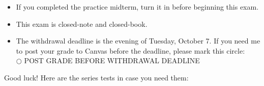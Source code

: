 \documentclass[12pt]{exam}
\begin{document}
\begin{center}
\end{center}
\vspace{0.1in}

\vspace{12pt}

\begin{itemize}
  \item If you completed the practice midterm, turn it in before beginning
        this exam.
  \item This exam is closed-note and closed-book.
  \item The withdrawal deadline is the evening of Tuesday, October 7.
        If you need me to post your grade to Canvas before the deadline,
        please mark this circle:\\
        $\bigcirc$ POST GRADE BEFORE WITHDRAWAL DEADLINE
\end{itemize}

\noindent
Good luck! Here are the series tests in case you need them:

\vspace{12pt}
\end{document}

